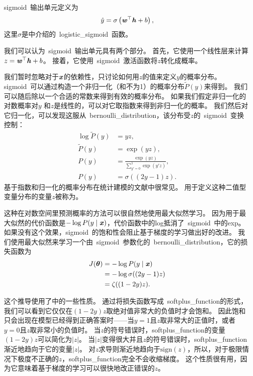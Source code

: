 \gls{sigmoid}~输出单元定义为
\begin{equation}
\hat{y} = \sigma \left (\boldsymbol{\mathit{w}}^\top \boldsymbol{\mathit{h}} + b \right ),
\end{equation}
这里$\sigma$是中介绍的~\gls{logistic_sigmoid}~函数。

我们可以认为~\gls{sigmoid}~输出单元具有两个部分。
首先，它使用一个线性层来计算$z=\boldsymbol{\mathit{w}}^\top \boldsymbol{\mathit{h}}+b$。
接着，它使用~\gls{sigmoid}~激活函数将$z$转化成概率。

我们暂时忽略对于$\boldsymbol{\mathit{x}}$的依赖性，只讨论如何用$z$的值来定义$y$的概率分布。
\gls{sigmoid}~可以通过构造一个非归一化（和不为1）的概率分布$\tilde{P}(y)$来得到。
我们可以随后除以一个合适的常数来得到有效的概率分布。
如果我们假定非归一化的对数概率对$y$ 和$z$是线性的，可以对它取指数来得到非归一化的概率。
我们然后对它归一化，可以发现这服从~\gls{bernoulli_distribution}，该分布受$z$的~\gls{sigmoid}~变换控制：
\begin{align}
\log \tilde{P}(y) &= yz,\\
\tilde{P}(y) &= \exp(yz),\\
P(y) &= \frac{\exp(yz)}{\sum_{y' = 0}^1 \exp(y' z)},\\
P(y) &= \sigma((2y-1)z).
\end{align}
基于指数和归一化的概率分布在统计建模的文献中很常见。
用于定义这种二值型变量分布的变量$z$被称为。


这种在对数空间里预测概率的方法可以很自然地使用最大似然学习。
因为用于最大似然的代价函数是$-\log P(y\mid\boldsymbol{\mathit{x}})$，代价函数中的log抵消了~\gls{sigmoid}~中的exp。
如果没有这个效果，\gls{sigmoid}~的饱和性会阻止基于梯度的学习做出好的改进。
我们使用最大似然来学习一个由~\gls{sigmoid}~参数化的~\gls{bernoulli_distribution}，它的损失函数为
\begin{align}
J(\boldsymbol{\theta}) &= -\log P(y\mid\boldsymbol{\mathit{x}})\\
&= -\log \sigma ((2y-1)z)\\
&= \zeta((1-2y)z).
\end{align}

这个推导使用了中的一些性质。
通过将损失函数写成~\gls{softplus_function}的形式，我们可以看到它仅仅在$(1-2y)z$取绝对值非常大的负值时才会饱和。
因此饱和只会出现在模型已经得到正确答案时——当$y=1$且$z$取非常大的正值时，或者$y=0$且$z$取非常小的负值时。
当$z$的符号错误时，\gls{softplus_function}的变量$(1-2y)z$可以简化为$|z|$。
当$|z|$变得很大并且$z$的符号错误时，\gls{softplus_function}渐近地趋向于它的变量$|z|$。
对$z$求导则渐近地趋向于$\text{sign}(z)$，所以，对于极限情况下极度不正确的$z$，\gls{softplus_function}完全不会收缩梯度。
这个性质很有用，因为它意味着基于梯度的学习可以很快地改正错误的$z$。

